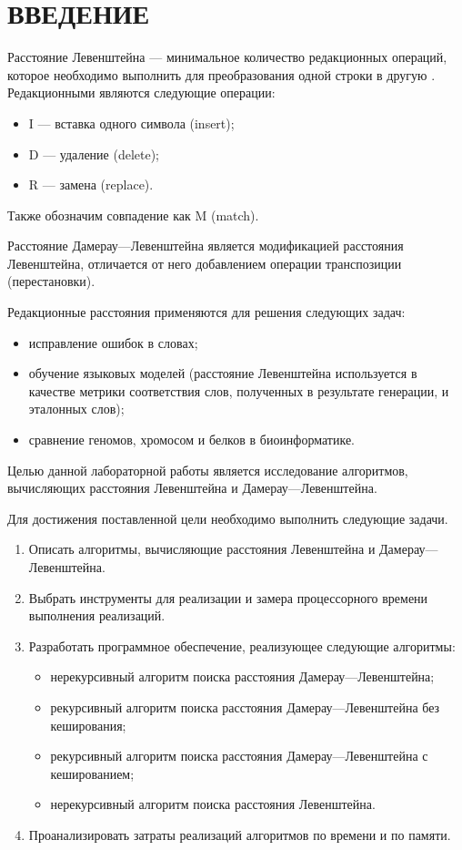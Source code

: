 \chapter*{ВВЕДЕНИЕ}

Расстояние Левенштейна --- минимальное количество редакционных операций, которое необходимо выполнить для преобразования одной строки в другую \cite{levenshtein}. 
Редакционными являются следующие операции: 
\begin{itemize}
	\item I --- вставка одного символа (insert);
	\item D --- удаление (delete);
	\item R --- замена (replace).
\end{itemize}
Также обозначим совпадение как M (match).

Расстояние Дамерау---Левенштейна является модификацией расстояния Левенштейна, отличается от него добавлением операции транспозиции (перестановки).  

Редакционные расстояния применяются для решения следующих задач:
\begin{itemize}
	\item исправление ошибок в словах;
	\item обучение языковых моделей (расстояние Левенштейна используется в качестве метрики соответствия слов, полученных в результате генерации, и эталонных слов);
	\item сравнение геномов, хромосом и белков в биоинформатике.
\end{itemize}

Целью данной лабораторной работы является исследование алгоритмов, вычисляющих расстояния Левенштейна и Дамерау---Левенштейна.

Для достижения поставленной цели необходимо выполнить следующие задачи.
\begin{enumerate}
	\item Описать алгоритмы, вычисляющие расстояния Левенштейна и Дамерау---Левенштейна.
	\item Выбрать инструменты для реализации и замера процессорного времени выполнения реализаций.
	\item Разработать программное обеспечение, реализующее следующие алгоритмы:
	\begin{itemize}
		\item нерекурсивный алгоритм поиска расстояния Дамерау---Левенштейна;
		\item рекурсивный алгоритм поиска расстояния Дамерау---Левенштейна без кеширования;
		\item рекурсивный алгоритм поиска расстояния Дамерау---Левенштейна с кешированием;
		\item нерекурсивный алгоритм поиска расстояния Левенштейна.
	\end{itemize}
	\item Проанализировать затраты реализаций алгоритмов по времени и по памяти.
\end{enumerate}
